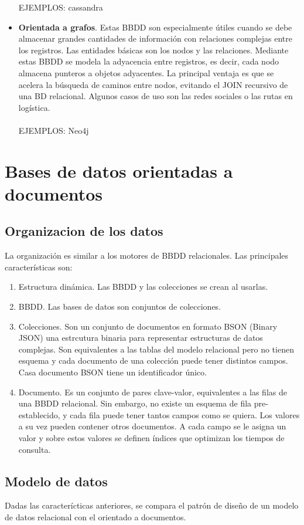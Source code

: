 \begin{itemize}
	EJEMPLOS: cassandra
	\item \textbf{Orientada a grafos}. Estas BBDD son especialmente útiles cuando se debe almacenar grandes cantidades de información con relaciones complejas entre los registros. Las entidades básicas son los nodos y las relaciones. Mediante estas BBDD se modela la adyacencia entre registros, es decir, cada nodo almacena punteros a objetos adyacentes. La principal ventaja es que se acelera la búsqueda de caminos entre nodos, evitando el JOIN recursivo de una BD relacional. Algunos casos de uso son las redes sociales o las rutas en logística.\\\\
	EJEMPLOS: Neo4j
\end{itemize}
\section{Bases de datos orientadas a documentos}
\subsection{Organizacion de los datos}
La organización es similar a los motores de BBDD relacionales. Las principales características son:
\begin{enumerate}
	\item Estructura dinámica. Las BBDD y las colecciones se crean al usarlas.
	\item BBDD. Las bases de datos son conjuntos de colecciones.
	\item Colecciones. Son un conjunto de documentos en formato BSON (Binary JSON) una estrcutura binaria para representar estructuras de datos complejas. Son equivalentes a las tablas del modelo relacional pero no tienen esquema y cada documento de una colección puede tener distintos campos. Casa documento BSON tiene un identificador único.
	\item Documento. Es un conjunto de pares clave-valor, equivalentes a las filas de una BBDD relacional. Sin embargo, no existe un esquema de fila pre-establecido, y cada fila puede tener tantos campos como se quiera. Los valores a su vez pueden contener otros documentos. A cada campo se le asigna un valor y sobre estos valores se definen índices que optimizan los tiempos de consulta.
\end{enumerate}
\subsection{Modelo de datos}
Dadas las caracterícticas anteriores, se compara el patrón de diseño de un modelo de datos relacional con el orientado a documentos. \\

